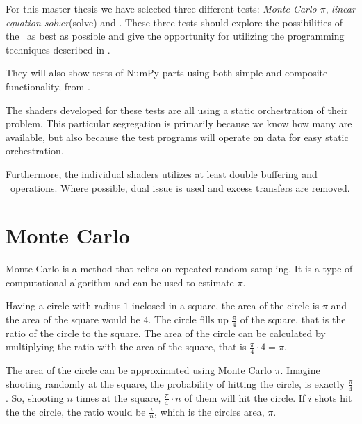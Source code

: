
For this master thesis we have selected three different tests:
\textit{Monte Carlo $\pi$}, \textit{linear equation
  solver}(solve) and \SOR{}. These three tests should explore the
  possibilities of the
\CBE\ as best as possible and give the opportunity for utilizing the
programming techniques described in .


They will also show tests of NumPy parts using both simple and
composite functionality, from .

The shaders developed for these tests are all using a static
orchestration of their problem. This particular segregation is primarily
because we know how many  are available, but also because
the test programs will operate on data for easy static orchestration.

Furthermore, the individual shaders utilizes at least double buffering
and \SIMD\ operations. Where possible, dual issue is used and excess
transfers are removed.


\section{Monte Carlo}

Monte Carlo is a method that relies on repeated random sampling. It is
a type of computational algorithm and can be used to estimate $\pi$.

Having a circle with radius $1$ inclosed in a square, the area of the
circle is $\pi$ and the area of the square would be $4$. The circle
fills up $\frac{\pi}{4}$ of the square, that is the ratio of the
circle to the square. The area of the circle can be calculated by
multiplying the ratio with the area of the square, that is
$\frac{\pi}{4} \cdot 4 = \pi$. 





The area of the circle can be approximated using Monte Carlo
$\pi$. Imagine shooting randomly at the square, the probability of
hitting the circle, is exactly $\frac{\pi}{4}$. So, shooting $n$ times
at the square, $\frac{\pi}{4} \cdot n$ of them will hit the circle. If
$i$ shots hit the the circle, the ratio would be $\frac{i}{n}$, which
is the circles area, $\pi$.

